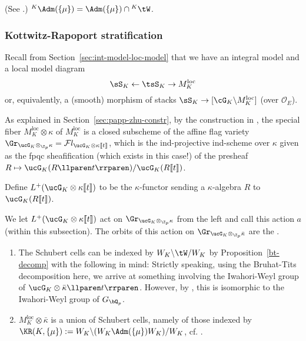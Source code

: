 \documentclass[a4paper]{scrartcl} %
\numberwithin{equation}{section}
\begin{document}
\begin{Lemma}\textnormal{(See \cite[Thm.~1.2.2]{SYZnew}.)} 
  $^K\Adm(\{\mu\})=\Adm(\{\mu\})\cap{}^K\tW$.
\end{Lemma}



\subsubsection{Kottwitz-Rapoport stratification}
\label{sec:kottw-rapop-strat}

Recall from Section~\ref{sec:int-model-loc-model} that we have an integral model and a local model diagram
\begin{equation*}
  \sS_K \leftarrow \tsS_K \to M^\mathrm{loc}_K
\end{equation*}
or, equivalently, a (smooth) morphism of stacks $\sS_K \to [\cG_K \backslash M^\mathrm{loc}_K]$ (over $\mathcal{O}_E$).

As explained in Section~\ref{sec:papp-zhu-constr}, by the construction in \cite{pappas-zhu}, the special fiber $M^\mathrm{loc}_K\otimes\kappa$ of $M^\mathrm{loc}_K$ is a closed subscheme of the affine flag variety $\Gr_{\ucG_K\otimes_{\Z_p}\kappa}=\mathcal{F}l_{\ucG_K\otimes\kappa\llbracket t\rrbracket}$, which is the ind-projective ind-scheme over $\kappa$ given as the fpqc sheafification (which exists in this case!) of the presheaf $R\mapsto \ucG_K(R\llparen t\rrparen)/\ucG_K(R\llbracket t\rrbracket)$.

\begin{Definition}
  Define $L^+(\ucG_K\otimes\kappa\llbracket t\rrbracket)$ to be the $\kappa$-functor sending a $\kappa$-algebra $R$ to $\ucG_K(R\llbracket t\rrbracket)$.

  We let $L^+(\ucG_K\otimes\kappa\llbracket t\rrbracket)$ act on $\Gr_{\ucG_K\otimes_{\Z_p}\kappa}$ from the left and call this action $a$ (within this subsection).  The orbits of this action on $\Gr_{\ucG_K\otimes_{\Z_p}\bar\kappa}$ are the .
\end{Definition}

\begin{Remarks}\label{schubert-cell-indexing}
  \begin{enumerate}[(1)]
  \item \label{item:schubert-cell-indexing}The Schubert cells can be indexed by $W_K\backslash \tW/W_K$ by Proposition~\ref{bt-decomp} with the following in mind: Strictly speaking, using the Bruhat-Tits decomposition here, we arrive at something involving the Iwahori-Weyl group of $\ucG_K\otimes\bar{\kappa}\llparen t\rrparen$. However, by \cite[.2]{pappas-zhu}, this is isomorphic to the Iwahori-Weyl group of $G_{\bQ_p}$.
  \item $M^\mathrm{loc}_K\otimes\bar{\kappa}$ is a union of Schubert cells, namely of those indexed by $\KR(K,\{\mu\}):=W_K\backslash (W_K\Adm(\{\mu\})W_K)/W_K$, cf. \cite[Theorem~9.3]{pappas-zhu}.
  \end{enumerate}
\end{Remarks}
\end{document}
